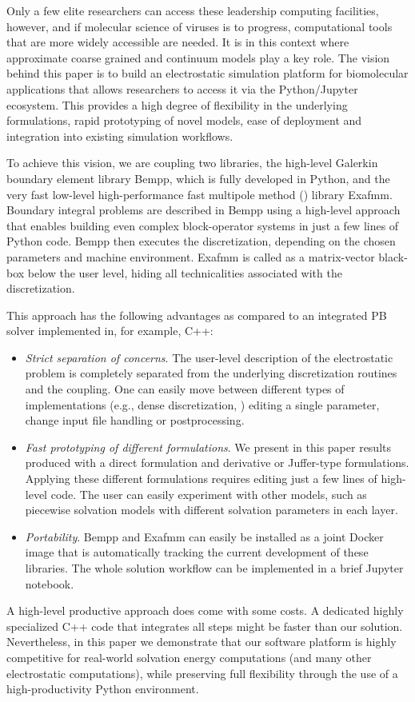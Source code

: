 Only a few elite researchers can access these leadership computing facilities, however, and if molecular science of viruses is to progress, computational tools that are more widely accessible are needed.
It is in this context where approximate coarse grained \cite{ReddySansom2016,MachadoETal2017,HuberETal2021} and continuum models \cite{MartinezETal2019} play a key role.
The vision behind this paper is to build an electrostatic simulation platform for biomolecular applications that allows researchers to access it via the Python/Jupyter ecosystem. This provides a high degree of flexibility in the underlying formulations, rapid prototyping of novel models, ease of deployment and integration into existing simulation workflows.

To achieve this vision, we are coupling two libraries, the high-level Galerkin boundary element library Bempp, which is fully developed in Python, and the very fast low-level high-performance fast multipole method (\fmm) library Exafmm. 
Boundary integral problems are described in Bempp using a high-level approach that enables building even complex block-operator systems in just a few lines of Python code. Bempp then executes the discretization, depending on the chosen parameters and machine environment. 
Exafmm is called as a matrix-vector black-box below the user level, hiding all technicalities associated with the discretization.

This approach has the following advantages as compared to an integrated PB solver implemented in, for example, C++:
\begin{itemize}
	\item \textit{Strict separation of concerns}. The user-level description of the electrostatic problem is completely separated from the underlying discretization routines and the \fmm coupling. One can easily move between different types of implementations (e.g., dense discretization, \fmm) editing a single parameter, change input file handling or postprocessing.
	\item \textit{Fast prototyping of different formulations}. We present in this paper results produced with a direct formulation and derivative or Juffer-type formulations. Applying these different formulations requires editing just a few lines of high-level code. The user can easily experiment with other models, such as piecewise solvation models with different solvation parameters in each layer.
	\item \textit{Portability}. Bempp and Exafmm can easily be installed as a joint Docker image that is automatically tracking the current development of these libraries. The whole solution workflow can be implemented in a brief Jupyter notebook.
\end{itemize}
A high-level productive approach does come with some costs. A dedicated highly specialized C++ code that integrates all steps might be faster than our solution. Nevertheless, in this paper we demonstrate that our software platform is highly competitive for real-world solvation energy computations (and many other electrostatic computations), while preserving full flexibility through the use of a high-productivity Python environment.

